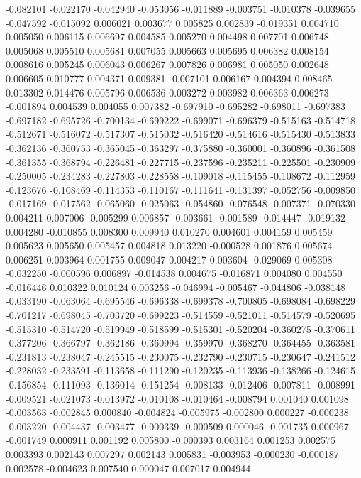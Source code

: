 -0.082101
-0.022170
-0.042940
-0.053056
-0.011889
-0.003751
-0.010378
-0.039655
-0.047592
-0.015092
0.006021
0.003677
0.005825
0.002839
-0.019351
0.004710
0.005050
0.006115
0.006697
0.004585
0.005270
0.004498
0.007701
0.006748
0.005068
0.005510
0.005681
0.007055
0.005663
0.005695
0.006382
0.008154
0.008616
0.005245
0.006043
0.006267
0.007826
0.006981
0.005050
0.002648
0.006605
0.010777
0.004371
0.009381
-0.007101
0.006167
0.004394
0.008465
0.013302
0.014476
0.005796
0.006536
0.003272
0.003982
0.006363
0.006273
-0.001894
0.004539
0.004055
0.007382
-0.697910
-0.695282
-0.698011
-0.697383
-0.697182
-0.695726
-0.700134
-0.699222
-0.699071
-0.696379
-0.515163
-0.514718
-0.512671
-0.516072
-0.517307
-0.515032
-0.516420
-0.514616
-0.515430
-0.513833
-0.362136
-0.360753
-0.365045
-0.363297
-0.375880
-0.360001
-0.360896
-0.361508
-0.361355
-0.368794
-0.226481
-0.227715
-0.237596
-0.235211
-0.225501
-0.230909
-0.250005
-0.234283
-0.227803
-0.228558
-0.109018
-0.115455
-0.108672
-0.112959
-0.123676
-0.108469
-0.114353
-0.110167
-0.111641
-0.131397
-0.052756
-0.009850
-0.017169
-0.017562
-0.065060
-0.025063
-0.054860
-0.076548
-0.007371
-0.070330
0.004211
0.007006
-0.005299
0.006857
-0.003661
-0.001589
-0.014447
-0.019132
0.004280
-0.010855
0.008300
0.009940
0.010270
0.004601
0.004159
0.005459
0.005623
0.005650
0.005457
0.004818
0.013220
-0.000528
0.001876
0.005674
0.006251
0.003964
0.001755
0.009047
0.004217
0.003604
-0.029069
0.005308
-0.032250
-0.000596
0.006897
-0.014538
0.004675
-0.016871
0.004080
0.004550
-0.016446
0.010322
0.010124
0.003256
-0.046994
-0.005467
-0.044806
-0.038148
-0.033190
-0.063064
-0.695546
-0.696338
-0.699378
-0.700805
-0.698084
-0.698229
-0.701217
-0.698045
-0.703720
-0.699223
-0.514559
-0.521011
-0.514579
-0.520695
-0.515310
-0.514720
-0.519949
-0.518599
-0.515301
-0.520204
-0.360275
-0.370611
-0.377206
-0.366797
-0.362186
-0.360994
-0.359970
-0.368270
-0.364455
-0.363581
-0.231813
-0.238047
-0.245515
-0.230075
-0.232790
-0.230715
-0.230647
-0.241512
-0.228032
-0.233591
-0.113658
-0.111290
-0.120235
-0.113936
-0.138266
-0.124615
-0.156854
-0.111093
-0.136014
-0.151254
-0.008133
-0.012406
-0.007811
-0.008991
-0.009521
-0.021073
-0.013972
-0.010108
-0.010464
-0.008794
0.001040
0.001098
-0.003563
-0.002845
0.000840
-0.004824
-0.005975
-0.002800
0.000227
-0.000238
-0.003220
-0.004437
-0.003477
-0.000339
-0.000509
0.000046
-0.001735
0.000967
-0.001749
0.000911
0.001192
0.005800
-0.000393
0.003164
0.001253
0.002575
0.003393
0.002143
0.007297
0.002143
0.005831
-0.003953
-0.000230
-0.000187
0.002578
-0.004623
0.007540
0.000047
0.007017
0.004944
